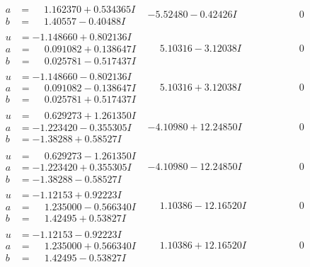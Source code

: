 \documentclass[1p]{elsarticle_modified}
\theoremstyle{definition}
\begin{document}
$$\begin{array}{c|c|c}
\begin{aligned}
a &= \phantom{-}1.162370 + 0.534365 I \\
b &= \phantom{-}1.40557 - 0.40488 I\end{aligned}
 & -5.52480 - 0.42426 I & \phantom{-0.000000 } 0 \\ \hline\begin{aligned}
u &= -1.148660 + 0.802136 I \\
a &= \phantom{-}0.091082 + 0.138647 I \\
b &= \phantom{-}0.025781 - 0.517437 I\end{aligned}
 & \phantom{-}5.10316 - 3.12038 I & \phantom{-0.000000 } 0 \\ \hline\begin{aligned}
u &= -1.148660 - 0.802136 I \\
a &= \phantom{-}0.091082 - 0.138647 I \\
b &= \phantom{-}0.025781 + 0.517437 I\end{aligned}
 & \phantom{-}5.10316 + 3.12038 I & \phantom{-0.000000 } 0 \\ \hline\begin{aligned}
u &= \phantom{-}0.629273 + 1.261350 I \\
a &= -1.223420 - 0.355305 I \\
b &= -1.38288 + 0.58527 I\end{aligned}
 & -4.10980 + 12.24850 I & \phantom{-0.000000 } 0 \\ \hline\begin{aligned}
u &= \phantom{-}0.629273 - 1.261350 I \\
a &= -1.223420 + 0.355305 I \\
b &= -1.38288 - 0.58527 I\end{aligned}
 & -4.10980 - 12.24850 I & \phantom{-0.000000 } 0 \\ \hline\begin{aligned}
u &= -1.12153 + 0.92223 I \\
a &= \phantom{-}1.235000 - 0.566340 I \\
b &= \phantom{-}1.42495 + 0.53827 I\end{aligned}
 & \phantom{-}1.10386 - 12.16520 I & \phantom{-0.000000 } 0 \\ \hline\begin{aligned}
u &= -1.12153 - 0.92223 I \\
a &= \phantom{-}1.235000 + 0.566340 I \\
b &= \phantom{-}1.42495 - 0.53827 I\end{aligned}
 & \phantom{-}1.10386 + 12.16520 I & \phantom{-0.000000 } 0 \\ \hline\begin{aligned}

\end{aligned}
\end{array}$$
\end{document}
